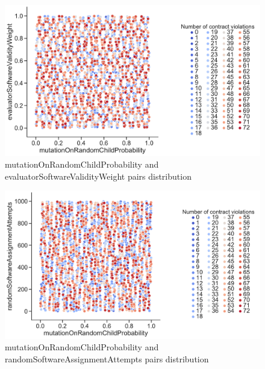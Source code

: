 \begin{figure}
	\centering
	\includegraphics[width=\textwidth]{images/PairsDistr/mutationOnRandomChildProbability_evaluatorSoftwareValidityWeight.pdf}
	\caption[mutationOnRandomChildProbability and evaluatorSoftwareValidityWeight pairs distribution]{mutationOnRandomChildProbability and evaluatorSoftwareValidityWeight pairs distribution}   
	\label{fig:mutationOnRandomChildProbability_evaluatorSoftwareValidityWeight_pair}
\end{figure}
\clearpage
\begin{figure}
	\centering
	\includegraphics[width=\textwidth]{images/PairsDistr/mutationOnRandomChildProbability_randomSoftwareAssignmentAttempts.pdf}
	\caption[mutationOnRandomChildProbability and randomSoftwareAssignmentAttempts pairs distribution]{mutationOnRandomChildProbability and randomSoftwareAssignmentAttempts pairs distribution} 
	\label{fig:mutationOnRandomChildProbability_randomSoftwareAssignmentAttempts_pair}
\end{figure}
\clearpage
